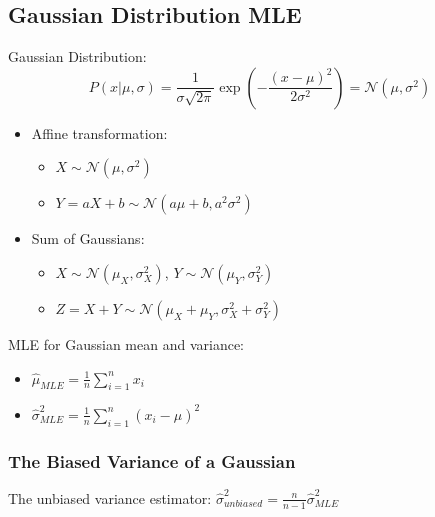 \documentclass[letterpaper, 10pt, twocolumn]{article}
\begin{document}
\subsection{Gaussian Distribution MLE}

Gaussian Distribution:
$$P(x|\mu,\sigma)=\frac{1}{\sigma\sqrt{2\pi}}\exp(-\frac{(x-\mu)^2}{2\sigma^2})=\mathcal{N}(\mu,\sigma^2)$$
\begin{itemize}
	\item Affine transformation:
	\begin{itemize}
		\item $X \sim \mathcal{N}(\mu,\sigma^2)$
		\item $Y=aX+b \sim \mathcal{N}(a\mu+b,a^2\sigma^2)$
	\end{itemize}
	\item Sum of Gaussians:
	\begin{itemize}
		\item $X \sim \mathcal{N}(\mu_X,\sigma^2_X)$, $Y \sim \mathcal{N}(\mu_Y,\sigma^2_Y)$
		\item $Z=X+Y \sim \mathcal{N}(\mu_X+\mu_Y,\sigma^2_X+\sigma^2_Y)$
	\end{itemize}
\end{itemize}

MLE for Gaussian mean and variance:
\begin{itemize}
	\item $\hat{\mu}_{MLE}=\frac{1}{n}\sum_{i=1}^{n}{x_i}$
	\item $\hat{\sigma}^2_{MLE}=\frac{1}{n}\sum_{i=1}^{n}{(x_i-\hat{\mu})^2}$
\end{itemize}

\subsubsection{The Biased Variance of a Gaussian}

The unbiased variance estimator:
$\hat{\sigma}^2_{unbiased}=\frac{n}{n-1}\hat{\sigma}^2_{MLE}$
\end{document}
